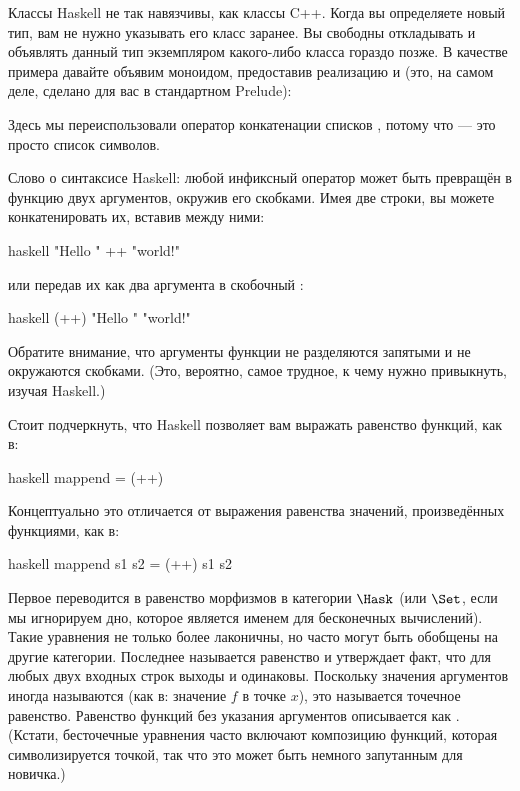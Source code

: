 Классы Haskell не так навязчивы, как классы C++. Когда вы
определяете новый тип, вам не нужно указывать его класс заранее. Вы
свободны откладывать и объявлять данный тип экземпляром
какого-либо класса гораздо позже. В качестве примера давайте объявим 
моноидом, предоставив реализацию  и
 (это, на самом деле, сделано для вас в стандартном
Prelude):

Здесь мы переиспользовали оператор конкатенации списков \code{(++)},
потому что  --- это просто список символов.

Слово о синтаксисе Haskell: любой инфиксный оператор может быть превращён в
функцию двух аргументов, окружив его скобками. Имея две
строки, вы можете конкатенировать их, вставив \code{++} между ними:

\begin{snip}{haskell}
"Hello " ++ "world!"
\end{snip}
или передав их как два аргумента в скобочный \code{(++)}:

\begin{snip}{haskell}
(++) "Hello " "world!"
\end{snip}
Обратите внимание, что аргументы функции не разделяются запятыми и не
окружаются скобками. (Это, вероятно, самое трудное, к чему нужно привыкнуть,
изучая Haskell.)

Стоит подчеркнуть, что Haskell позволяет вам выражать равенство
функций, как в:

\begin{snip}{haskell}
mappend = (++)
\end{snip}
Концептуально это отличается от выражения равенства значений,
произведённых функциями, как в:

\begin{snip}{haskell}
mappend s1 s2 = (++) s1 s2
\end{snip}
Первое переводится в равенство морфизмов в категории
$\Hask$ (или $\Set$, если мы игнорируем дно, которое является именем
для бесконечных вычислений). Такие уравнения не только более
лаконичны, но часто могут быть обобщены на другие категории. Последнее
называется  равенство и утверждает факт, что для любых
двух входных строк выходы  и \code{(++)}
одинаковы. Поскольку значения аргументов иногда называются
 (как в: значение $f$ в точке $x$), это называется
точечное равенство. Равенство функций без указания аргументов
описывается как . (Кстати, бесточечные уравнения
часто включают композицию функций, которая символизируется точкой,
так что это может быть немного запутанным для новичка.)

